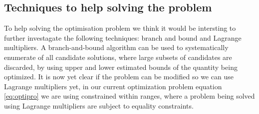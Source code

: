 \subsection{Techniques to help solving the problem}
To help solving the optimisation problem we think it would be intersting to further investagate the following techniques: branch and bound and Lagrange multipliers.
A branch-and-bound algorithm can be used to systematically enumerate  of all candidate solutions, where large subsets of candidates are discarded, by using upper and lower estimated bounds of the quantity being optimized. 
It is now yet clear if the problem can be modified so we can use Lagrange multipliers yet, in our current optimization problem equation \ref{eq:optipro} we are using constrained within ranges, where a problem being solved using Lagrange multipliers are subject to equality constraints.


